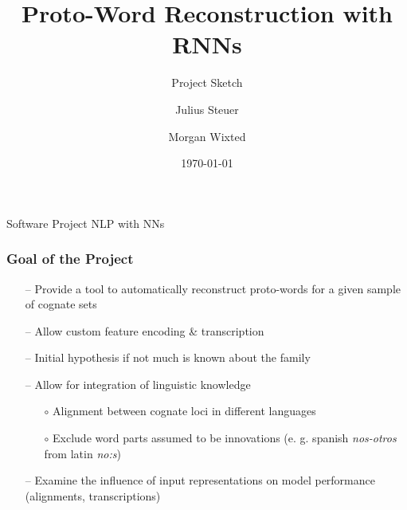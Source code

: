\documentclass[11pt]{beamer}
\title{Proto-Word Reconstruction with RNNs}
\subtitle{Project Sketch}
\date{\today}
\author{Julius Steuer \and Morgan Wixted}
\begin{document}
\begin{frame}[plain]
    \small
    Software Project NLP with NNs
    \normalsize
    \titlepage
\end{frame}

\begin{frame}
    \frametitle{Goal of the Project}
    \begin{itemize}
        \item[--] Provide a tool to automatically reconstruct proto-words for a given sample of cognate sets
        \item[--] Allow custom feature encoding \& transcription
        \item[--] Initial hypothesis if not much is known about the family
        \item[--] Allow for integration of linguistic knowledge
        \begin{itemize}
            \item[$\circ$] Alignment between cognate loci in different languages
            \item[$\circ$] Exclude word parts assumed to be innovations (e. g. spanish \textit{nos-otros} from latin \textit{no:s}) 
        \end{itemize}
        \item[--] Examine the influence of input representations on model performance (alignments, transcriptions) 
    \end{itemize}
\end{frame}
\end{document}
